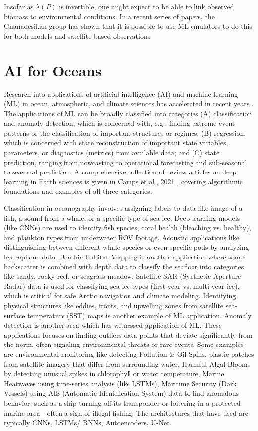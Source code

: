 \documentclass{article}
\begin{document}
Insofar as  $\lambda(P)$  is invertible, one might expect to be able to link observed biomass to environmental conditions. In a recent series of papers, the Gnanadesikan group has shown that it is possible to use ML emulators to do this for both models \citep{holder2021can, holder2022using, holder2023well} and satellite-based observations \citep{holder2023well, jin2024using, dutta2025using}  

\section{AI for Oceans}
Research into applications of artificial intelligence (AI) and machine learning (ML) in ocean, atmospheric, and climate sciences has accelerated in recent years \citep{eyring2024pushing, 10505123}. The applications of ML can be broadly classified into categories (A) classification and anomaly detection, which is concerned with, e.g., finding extreme event patterns or the classification of important structures or regimes; (B) regression, which is concerned with state reconstruction of important state variables, parameters, or diagnostics (metrics) from available data; and (C) state prediction, ranging from nowcasting to operational forecasting and sub-seasonal to seasonal prediction. A comprehensive collection of review articles on deep learning in Earth sciences is given in Camps et al., 2021 \cite{camps2021deep}, covering algorithmic foundations and examples of all three categories.

Classification in oceanography involves assigning labels to data like image of a fish, a sound from a whale, or a specific type of sea ice. Deep learning models (like CNNs) are used to identify fish species, coral health (bleaching vs. healthy), and plankton types from underwater ROV footage. Acoustic applications like distinguishing between different whale species or even specific pods by analyzing hydrophone data. Benthic Habitat Mapping is another application where sonar backscatter is combined with depth data to classify the seafloor into categories like sandy, rocky reef, or seagrass meadow. Satellite SAR (Synthetic Aperture Radar) data is used for classifying sea ice types (first-year vs. multi-year ice), which is critical for safe Arctic navigation and climate modeling. Identifying physical structures like eddies, fronts, and upwelling zones from satellite sea-surface temperature (SST) maps is another example of ML application. Anomaly detection is another area which has witnessed application of ML. These applications focuses on finding outliers data points that deviate significantly from the norm, often signaling environmental threats or rare events. Some examples are 
environmental monitoring like detecting Pollution \& Oil Spills, plastic patches from  satellite imagery that differ from surrounding water, Harmful Algal Blooms by detecting unusual spikes in chlorophyll or water temperature, Marine Heatwaves using time-series analysis (like LSTMs), Maritime Security (Dark Vessels) using AIS (Automatic Identification System) data to find anomalous behavior, such as a ship turning off its transponder or loitering in a protected marine area—often a sign of illegal fishing. The architectures that have used are typically CNNs, LSTMs/ RNNs, Autoencoders, U-Net. 
\end{document}
